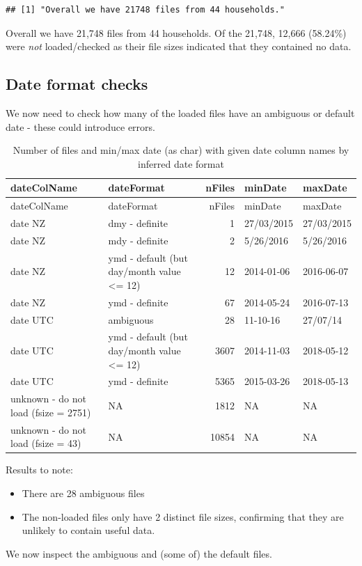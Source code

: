 \documentclass[]{article}
\providecommand{\tightlist}{%
  \setlength{\itemsep}{0pt}\setlength{\parskip}{0pt}}
\begin{document}
\begin{verbatim}
## [1] "Overall we have 21748 files from 44 households."
\end{verbatim}

Overall we have 21,748 files from 44 households. Of the 21,748, 12,666
(58.24\%) were \emph{not} loaded/checked as their file sizes indicated
that they contained no data.

\subsection{Date format checks}\label{date-format-checks}

We now need to check how many of the loaded files have an ambiguous or
default date - these could introduce errors.

\begin{longtable}[]{@{}llrll@{}}
\caption{Number of files and min/max date (as char) with given date
column names by inferred date format}\tabularnewline
\toprule
dateColName & dateFormat & nFiles & minDate & maxDate\tabularnewline
\midrule
\endfirsthead
\toprule
dateColName & dateFormat & nFiles & minDate & maxDate\tabularnewline
\midrule
\endhead
date NZ & dmy - definite & 1 & 27/03/2015 & 27/03/2015\tabularnewline
date NZ & mdy - definite & 2 & 5/26/2016 & 5/26/2016\tabularnewline
date NZ & ymd - default (but day/month value \textless{}= 12) & 12 &
2014-01-06 & 2016-06-07\tabularnewline
date NZ & ymd - definite & 67 & 2014-05-24 & 2016-07-13\tabularnewline
date UTC & ambiguous & 28 & 11-10-16 & 27/07/14\tabularnewline
date UTC & ymd - default (but day/month value \textless{}= 12) & 3607 &
2014-11-03 & 2018-05-12\tabularnewline
date UTC & ymd - definite & 5365 & 2015-03-26 &
2018-05-13\tabularnewline
unknown - do not load (fsize = 2751) & NA & 1812 & NA &
NA\tabularnewline
unknown - do not load (fsize = 43) & NA & 10854 & NA & NA\tabularnewline
\bottomrule
\end{longtable}

Results to note:

\begin{itemize}
\tightlist
\item
  There are 28 ambiguous files
\item
  The non-loaded files only have 2 distinct file sizes, confirming that
  they are unlikely to contain useful data.
\end{itemize}

We now inspect the ambiguous and (some of) the default files.
\end{document}

